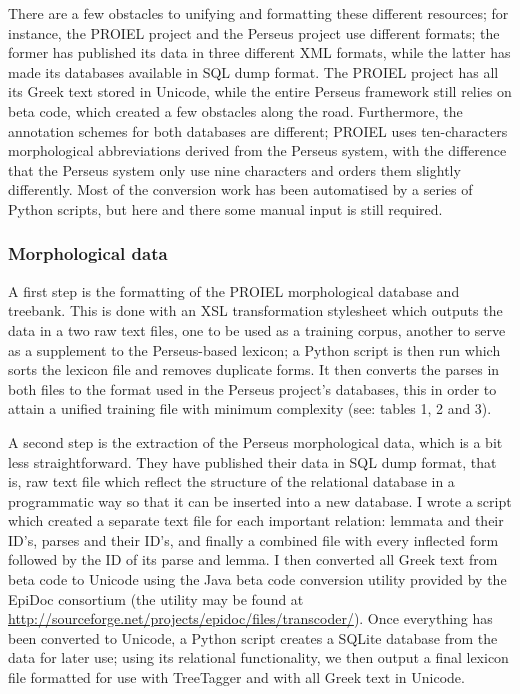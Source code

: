 There are a few obstacles to unifying and formatting these different
resources; for instance, the PROIEL project and the Perseus project use
different formats; the former has published its data in three different XML
formats, while the latter has made its databases available in SQL dump format.
The PROIEL project has all its Greek text stored in Unicode, while the entire
Perseus framework still relies on beta code, which created a few obstacles
along the road. Furthermore, the annotation schemes for both databases are
different; PROIEL uses ten-characters morphological abbreviations derived from
the Perseus system, with the difference that the Perseus system only use nine
characters and orders them slightly differently. Most of the conversion work
has been automatised by a series of Python scripts, but here and there some
manual input is still required. 


\subsubsection{Morphological data} %
\label{ssub:morphdata}

A first step is the formatting of the PROIEL morphological database and
treebank. This is done with an XSL transformation stylesheet which outputs the
data in a two raw text files, one to be used as a training corpus, another to
serve as a supplement to the Perseus-based lexicon; a Python script is then run
which sorts the lexicon file and removes duplicate forms. It then converts the
parses in both files to the format used in the Perseus project's databases,
this in order to attain a unified training file with minimum complexity (see:
tables 1, 2 and 3).

A second step is the extraction of the Perseus morphological data, which is a
bit less straightforward. They have published their data in SQL dump format,
that is, raw text file which reflect the structure of the relational database
in a programmatic way so that it can be inserted into a new database. I wrote a
script which created a separate text file for each important relation: lemmata
and their ID's, parses and their ID's, and finally a combined file with every
inflected form followed by the ID of its parse and lemma. I then converted all
Greek text from beta code to Unicode using the Java beta code conversion
utility provided by the EpiDoc consortium (the utility may be found at
\url{http://sourceforge.net/projects/epidoc/files/transcoder/}). Once
everything has been converted to Unicode, a Python script creates a SQLite
database from the data for later use; using its relational functionality, we
then output a final lexicon file formatted for use with TreeTagger and with all
Greek text in Unicode.

